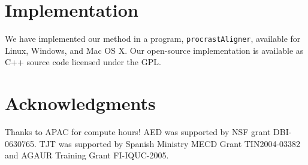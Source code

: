 \documentclass{ws-procs975x65}
\begin{document}
\section{Implementation}
We have implemented our method in a program, \texttt{procrastAligner}, available for Linux, Windows, and Mac OS X. Our open-source implementation is available as C++ source code licensed under the GPL.

\section{ Acknowledgments }
Thanks to APAC for compute hours! AED was supported by NSF grant DBI-0630765. TJT was
supported by Spanish Ministry MECD Grant TIN2004-03382 and AGAUR
Training Grant FI-IQUC-2005.




\end{document}
